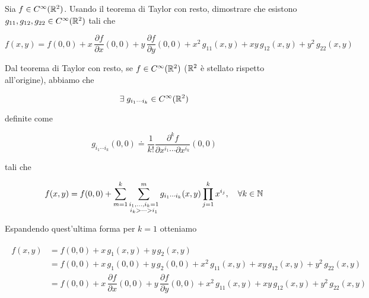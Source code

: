 %

\newpage

%

\section{}\label{es1-5}

\begin{tcolorbox}
	Sia $ f \in C^{\infty}(\mathbb{R}^{2}) $. Usando il teorema di Taylor con resto, dimostrare che esistono $ g_{11},g_{12},g_{22} \in C^{\infty}(\mathbb{R}^{2}) $ tali che
	
	\begin{equation}
		f(x,y) = f(0,0) + x \, \dfrac{\partial f}{\partial x} (0,0) + y \, \dfrac{\partial f}{\partial y} (0,0) + x^{2} \, g_{11}(x,y) + x y \, g_{12}(x,y) + y^{2} \, g_{22}(x,y)
	\end{equation}
\end{tcolorbox}

Dal teorema di Taylor con resto, se $ f \in C^{\infty} (\mathbb{R}^{2}) $ ($ \mathbb{R}^{2} $ è stellato rispetto all'origine), abbiamo che

\begin{equation}
	\exists \; g_{i_{1} \cdots i_{k}} \in C^{\infty} (\mathbb{R}^{2})
\end{equation}

definite come

\begin{equation}
	g_{i_{1} \cdots i_{k}} (0,0) \doteq \dfrac{1}{k!} \dfrac{\partial^{k} f}{\partial x^{i_{1}} \cdots \partial x^{i_{k}}} (0,0)
\end{equation}

tali che

\begin{equation}
	f(x,y) = f(0,0) + \sum_{m=1}^{k} \sum_{\substack{i_{1},\dots,i_{k}=1 \\ {i_{k}} > \cdots > i_{1}}}^{m} g_{i_{1} \cdots i_{k}} (x,y) \prod_{j=1}^{k} x^{i_{j}} \qcomma \forall k \in \N
\end{equation}

Espandendo quest'ultima forma per $ k=1 $ otteniamo

\begin{align}
	\begin{split}
		f(x,y) &= f(0,0) + x \, g_{1} (x,y) + y \, g_{2} (x,y)\\
		&= f(0,0) + x \, g_{1} (0,0) + y \, g_{2} (0,0) + x^{2} \, g_{11}(x,y) + x y \, g_{12}(x,y) + y^{2} \, g_{22}(x,y)\\
		&= f(0,0) + x \, \dfrac{\partial f}{\partial x} (0,0) + y \, \dfrac{\partial f}{\partial y} (0,0) + x^{2} \, g_{11}(x,y) + x y \, g_{12}(x,y) + y^{2} \, g_{22}(x,y)
	\end{split}
\end{align}

